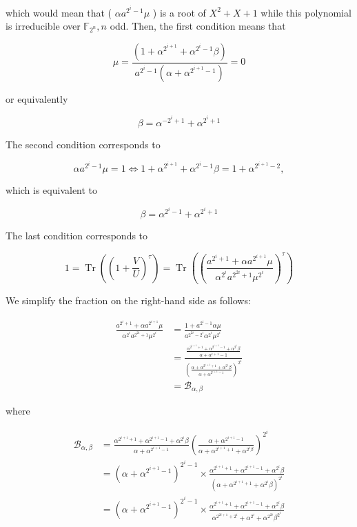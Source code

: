 \documentclass[10pt]{article}
\begin{document}
which would mean that ( $\alpha a^{2^{i}-1} \mu$ ) is a root of $X^{2}+X+1$ while this polynomial is irreducible over $\mathbb{F}_{2^{n}}, n$ odd. Then, the first condition means that

$$
\mu=\frac{\left(1+\alpha^{2^{i+1}}+\alpha^{2^{i}-1} \beta\right)}{a^{2^{i}-1}\left(\alpha+\alpha^{2^{i+1}-1}\right)}=0
$$

or equivalently

$$
\beta=\alpha^{-2^{i}+1}+\alpha^{2^{i}+1}
$$

The second condition corresponds to

$$
\alpha a^{2^{i}-1} \mu=1 \Leftrightarrow 1+\alpha^{2^{i+1}}+\alpha^{2^{i}-1} \beta=1+\alpha^{2^{i+1}-2},
$$

which is equivalent to

$$
\beta=\alpha^{2^{i}-1}+\alpha^{2^{i}+1}
$$

The last condition corresponds to

$$
1=\operatorname{Tr}\left(\left(1+\frac{V}{U}\right)^{\tau}\right)=\operatorname{Tr}\left(\left(\frac{a^{2^{i}+1}+\alpha a^{2^{i+1}} \mu}{\alpha^{2^{i}} a^{2^{2 i}+1} \mu^{2^{i}}}\right)^{\tau}\right)
$$

We simplify the fraction on the right-hand side as follows:

$$
\begin{aligned}
\frac{a^{2^{i}+1}+\alpha a^{2^{i+1}} \mu}{\alpha^{2^{i}} a^{2^{2 i}+1} \mu^{2^{i}}} & =\frac{1+a^{2^{i}-1} \alpha \mu}{a^{2^{2 i}-2^{i}} \alpha^{2^{i}} \mu^{2^{i}}} \\
& =\frac{\frac{\alpha^{2^{i+1}+1}+\alpha^{2^{i+1}-1}+\alpha^{2^{i}} \beta}{\alpha+\alpha^{i+1}-1}}{\left(\frac{\alpha+\alpha^{2^{i+1}+1}+\alpha^{2^{i}} \beta}{\alpha+\alpha^{2^{i+1}-1}}\right)^{2^{i}}} \\
& =\mathcal{B}_{\alpha, \beta}
\end{aligned}
$$

where

$$
\begin{aligned}
\mathcal{B}_{\alpha, \beta} & =\frac{\alpha^{2^{i+1}+1}+\alpha^{2^{i+1}-1}+\alpha^{2^{i}} \beta}{\alpha+\alpha^{2^{i+1}-1}}\left(\frac{\alpha+\alpha^{2^{i+1}-1}}{\alpha+\alpha^{2^{i+1}+1}+\alpha^{2^{i} \beta}}\right)^{2^{i}} \\
& =\left(\alpha+\alpha^{2^{i+1}-1}\right)^{2^{i}-1} \times \frac{\alpha^{2^{i+1}+1}+\alpha^{2^{i+1}-1}+\alpha^{2^{i}} \beta}{\left(\alpha+\alpha^{2^{i+1}+1}+\alpha^{2^{i}} \beta\right)^{2^{i}}} \\
& =\left(\alpha+\alpha^{2^{i+1}-1}\right)^{2^{i}-1} \times \frac{\alpha^{2^{i+1}+1}+\alpha^{2^{i+1}-1}+\alpha^{2^{i}} \beta}{\alpha^{2^{2 i+1}+2^{i}}+\alpha^{2^{i}}+\alpha^{2^{2 i}} \beta^{2^{i}}}
\end{aligned}
$$
\end{document}
